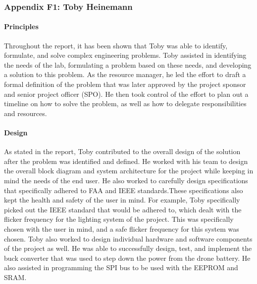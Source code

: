 \documentclass[../../main.tex]{subfiles}
\begin{document}
\subsubsection{Appendix F1: Toby Heinemann}

\paragraph{Principles}
\par Throughout the report, it has been shown that Toby was able to identify, formulate, and solve complex engineering problems. Toby assisted in identifying the needs of the lab, formulating a problem based on these needs, and developing a solution to this problem. As the resource manager, he led the effort to draft a formal definition of the problem that was later approved by the project sponsor and senior project officer (SPO). He then took control of the effort to plan out a timeline on how to solve the problem, as well as how to delegate responsibilities and resources. 

\paragraph{Design}
\par As stated in the report, Toby contributed to the overall design of the solution after the problem was identified and defined. He worked with his team to design the overall block diagram and system architecture for the project while keeping in mind the needs of the end user. He also worked to carefully design specifications that specifically adhered to FAA and IEEE standards.These specifications also kept the health and safety of the user in mind. For example, Toby specifically picked out the IEEE standard that would be adhered to, which dealt with the flicker frequency for the lighting system of the project. This was specifically chosen with the user in mind, and a safe flicker frequency for this system was chosen. Toby also worked to design individual hardware and software components of the project as well. He was able to successfully design, test, and implement the buck converter that was used to step down the power from the drone battery. He also assisted in programming the SPI bus to be used with the EEPROM and SRAM.
\end{document}
